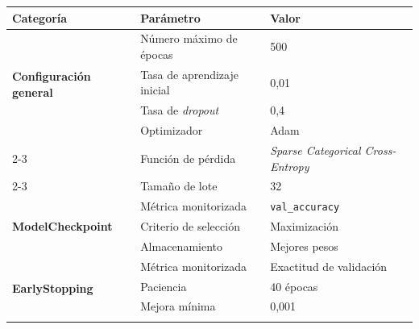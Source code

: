 \begin{table}[!ht]
    \centering

    \begin{tabular}{|p{4.5cm}|p{5.2cm}|p{4cm}|}
        \hline
        \textbf{Categoría}                              & \textbf{Parámetro}            & \textbf{Valor}                            \\ \hline
        \multirow{4}{*}{\textbf{Configuración general}} & Número máximo de épocas       & 500                                       \\ \cline{2-3}
        ~                                               & Tasa de aprendizaje inicial   & 0,01                                      \\ \cline{2-3}
        ~                                               & Tasa de \textit{dropout}      & 0,4                                       \\ \cline{2-3}
        ~                                               & Optimizador                   & Adam                                      \\ \cline{2-3}
        ~                                               & Función de pérdida            & \textit{Sparse Categorical Cross-Entropy} \\ \cline{2-3}
        ~                                               & Tamaño de lote                & 32                                        \\ \hline
        \multirow{3}{*}{\textbf{ModelCheckpoint}}       & Métrica monitorizada          & \texttt{val\_accuracy}                    \\ \cline{2-3}
        ~                                               & Criterio de selección         & Maximización                              \\ \cline{2-3}
        ~                                               & Almacenamiento                & Mejores pesos                             \\ \hline
        \multirow{4}{*}{\textbf{EarlyStopping}}         & Métrica monitorizada          & Exactitud de validación                   \\ \cline{2-3}
        ~                                               & Paciencia                     & 40 épocas                                 \\ \cline{2-3}
        ~                                               & Mejora mínima                 & 0,001                                     \\ \cline{2-3}

\end{tabular}
\end{table}
